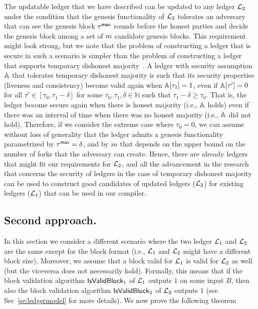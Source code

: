 The updatable ledger that we have described can be updated to any ledger $\mathcal{L}_2$ under the condition 
that the genesis functionality of $\mathcal{L}_2$ tolerates an adversary that can see the genesis block
$\tau^\mathsf{max}$ rounds before the honest parties and decide the genesis block among a set of $m$ candidate 
genesis blocks. This requirement might look strong, but we note that the problem of constructing a ledger 
that is secure in such a scenario is simpler than the problem of constructing a ledger that supports temporary dishonest majority~\cite{FC:AKWW19}. A ledger with security assumption $\mathbb{A}$ that tolerates temporary dishonest majority is such that its security properties (liveness and consistency) become valid again 
when $\mathbb{A}[\tau_1]=1$, even if $\mathbb{A}[\tau']=0$ for all $\tau'\in[\tau_0, \tau_1-\delta]$
for some $\tau_0,\tau_1,\delta \in\mathbb{N}$ such that  $\tau_1-\delta\geq \tau_0$. That is,
the ledger become secure again when there is honest majority (i.e., $\mathbb{A}$ holds) even if there was an interval of time when there was no honest majority (i.e., $\mathbb{A}$ did not hold).
Therefore, if we consider the extreme case where $\tau_0=0$, we can assume without loss of generality 
that the ledger admits a genesis functionality parametrized by $\tau^\mathsf{max}=\delta$, and by $m$
that depends on the upper bound on the number of forks that the adversary can create. 
Hence, there are already ledgers that might fit our requirements for $\mathcal{L}_2$, and all the advancement in the 
research that concerns the security of ledgers in the case of temporary dishonest majority can be used 
to construct good candidates of updated ledgers ($\mathcal{L}_2$) for existing ledgers ($\mathcal{L}_1$) that can be used in our compiler.






\subsection{Second approach.}
In this section we consider a different scenario where the two ledger $\mathcal{L}_1$ and $\mathcal{L}_2$
are the same except for the block format (i.e., $\mathcal{L}_1$ and $\mathcal{L}_2$ might have a different block size).
Moreover, we assume that a block valid for $\mathcal{L}_1$ is valid for $\mathcal{L}_2$ as well (but the viceversa does not necessarily hold). Formally, this means that if the block validation algorithm  $\mathsf{IsValidBlock}_1$ of $\mathcal{L}_1$
outputs $1$ on some input $B$, then also the block validation algorithm $\mathsf{IsValidBlock}_2$ of $\mathcal{L}_2$ outputs $1$ (see Sec~\ref{se:ledgermodel} for more details).
We now prove the following theorem


